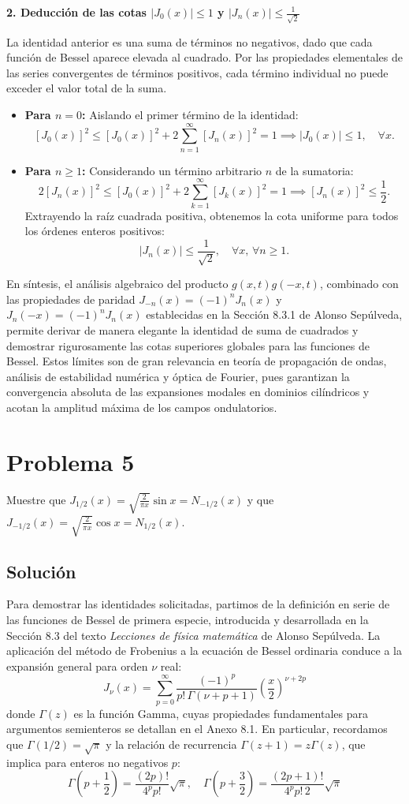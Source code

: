 \documentclass[a4paper]{article}
\begin{document}
\textbf{2. Deducción de las cotas $|J_0(x)| \le 1$ y $|J_n(x)| \le \frac{1}{\sqrt{2}}$}

La identidad anterior es una suma de términos no negativos, dado que cada función de Bessel aparece elevada al cuadrado. Por las propiedades elementales de las series convergentes de términos positivos, cada término individual no puede exceder el valor total de la suma.
\begin{itemize}
\item \textbf{Para $n=0$:} Aislando el primer término de la identidad:
$$[J_0(x)]^2 \le [J_0(x)]^2 + 2\sum_{n=1}^{\infty} [J_n(x)]^2 = 1 \implies |J_0(x)| \le 1, \quad \forall x.$$
\item \textbf{Para $n \ge 1$:} Considerando un término arbitrario $n$ de la sumatoria:
$$2[J_n(x)]^2 \le [J_0(x)]^2 + 2\sum_{k=1}^{\infty} [J_k(x)]^2 = 1 \implies [J_n(x)]^2 \le \frac{1}{2}.$$
Extrayendo la raíz cuadrada positiva, obtenemos la cota uniforme para todos los órdenes enteros positivos:
$$|J_n(x)| \le \frac{1}{\sqrt{2}}, \quad \forall x, \, \forall n \ge 1.$$
\end{itemize}
En síntesis, el análisis algebraico del producto $g(x,t)g(-x,t)$, combinado con las propiedades de paridad $J_{-n}(x)=(-1)^nJ_n(x)$ y $J_n(-x)=(-1)^nJ_n(x)$ establecidas en la Sección 8.3.1 de Alonso Sepúlveda, permite derivar de manera elegante la identidad de suma de cuadrados y demostrar rigurosamente las cotas superiores globales para las funciones de Bessel. Estos límites son de gran relevancia en teoría de propagación de ondas, análisis de estabilidad numérica y óptica de Fourier, pues garantizan la convergencia absoluta de las expansiones modales en dominios cilíndricos y acotan la amplitud máxima de los campos ondulatorios.



\section{Problema 5}
Muestre que $J_{1/2}(x)= \sqrt{\frac{2}{\pi x}} \sin x = N_{-1/2}(x)$ y que $J_{-1/2}(x)= \sqrt{\frac{2}{\pi x}} \cos x = N_{1/2}(x)$.

\subsection{Solución}
Para demostrar las identidades solicitadas, partimos de la definición en serie de las funciones de Bessel de primera especie, introducida y desarrollada en la Sección 8.3 del texto \textit{Lecciones de física matemática} de Alonso Sepúlveda. La aplicación del método de Frobenius a la ecuación de Bessel ordinaria conduce a la expansión general para orden $\nu$ real:
$$J_\nu(x) = \sum_{p=0}^{\infty} \frac{(-1)^p}{p! \, \Gamma(\nu + p + 1)} \left(\frac{x}{2}\right)^{\nu + 2p}$$
donde $\Gamma(z)$ es la función Gamma, cuyas propiedades fundamentales para argumentos semienteros se detallan en el Anexo 8.1. En particular, recordamos que $\Gamma(1/2) = \sqrt{\pi}$ y la relación de recurrencia $\Gamma(z+1) = z\Gamma(z)$, que implica para enteros no negativos $p$:
$$\Gamma\left(p + \frac{1}{2}\right) = \frac{(2p)!}{4^p p!} \sqrt{\pi}, \quad \Gamma\left(p + \frac{3}{2}\right) = \frac{(2p+1)!}{4^p p! \, 2} \sqrt{\pi}$$
\end{document}
